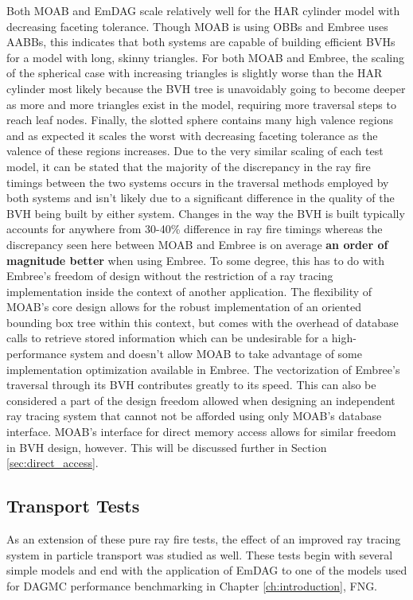 Both MOAB and EmDAG scale relatively well for the HAR cylinder model with
decreasing faceting tolerance. Though MOAB is using OBBs and Embree uses AABBs,
this indicates that both systems are capable of building efficient BVHs for a
model with long, skinny triangles. For both MOAB and Embree, the scaling of the
spherical case with increasing triangles is slightly worse than the HAR cylinder
most likely because the BVH tree is unavoidably going to become deeper as more
and more triangles exist in the model, requiring more traversal steps to reach
leaf nodes. Finally, the slotted sphere contains many high valence regions and
as expected it scales the worst with decreasing faceting tolerance as the
valence of these regions increases. Due to the very similar scaling of each test
model, it can be stated that the majority of the discrepancy in the ray fire
timings between the two systems occurs in the traversal methods employed by both
systems and isn't likely due to a significant difference in the quality of the
BVH being built by either system. Changes in the way the BVH is built typically
accounts for anywhere from 30-40\% difference in ray fire timings whereas the
discrepancy seen here between MOAB and Embree is on average \textbf{an order of
  magnitude better} when using Embree. To some degree, this has to do with
Embree's freedom of design without the restriction of a ray tracing
implementation inside the context of another application. The flexibility of
MOAB's core design allows for the robust implementation of an oriented bounding
box tree within this context, but comes with the overhead of database calls to
retrieve stored information which can be undesirable for a high-performance
system and doesn't allow MOAB to take advantage of some implementation
optimization available in Embree. The vectorization of Embree's traversal
through its BVH contributes greatly to its speed. This can also be considered a
part of the design freedom allowed when designing an independent ray tracing
system that cannot not be afforded using only MOAB's database
interface. MOAB's interface for direct memory access allows for similar freedom
in BVH design, however. This will be discussed further in Section
\ref{sec:direct_access}.

\subsection{Transport Tests}
\label{subsec:emdag_transport}

As an extension of these pure ray fire tests, the effect of an improved ray
tracing system in particle transport was studied as well. These tests begin with
several simple models and end with the application of EmDAG to one of the models
used for DAGMC performance benchmarking in Chapter \ref{ch:introduction}, FNG.

